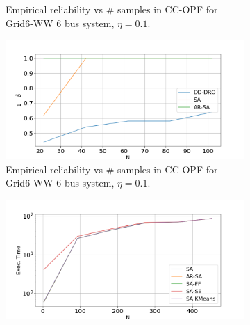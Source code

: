 \begin{figure}[hbt]
\begin{subfigure}{.50\textwidth}
  \caption{Empirical reliability %
  vs $\#$ samples  in CC-OPF for Grid6-WW 6 bus system, $\eta = 0.1$.}
  \label{fig:grid6reliability}
\end{subfigure}
\begin{subfigure}{.50\textwidth}
  \centering
  \hspace{0mm}\includegraphics[width=0.95\linewidth]{Dissertation/images/dynamic/grid6/dd-dro/1_beta_N_102_eta_0.1.png}
  \hspace{0mm}\caption{Empirical reliability %
  vs $\#$ samples  in CC-OPF for Grid6-WW 6 bus system, $\eta = 0.1$.}
  \label{fig:grid6reliability-dd-dro}
\end{subfigure}
\begin{subfigure}{.50\textwidth}
  \centering
\hspace{10mm}\includegraphics[width=0.95\linewidth]{Dissertation/images/dynamic/ieee30/exec_time_N_453_eta_0.01.png}~~~~~~\hfill

\end{subfigure}
\end{figure}
